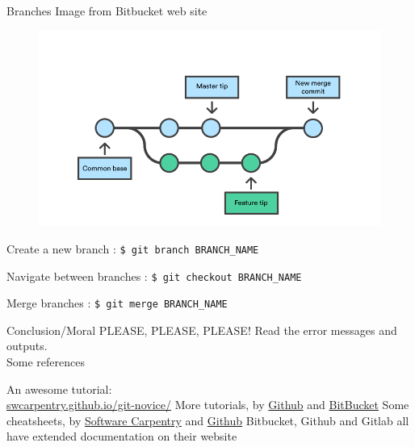 \documentclass{beamer}
\begin{document}
	\begin{frame}[fragile]{Branches}
		\footnotesize{Image from Bitbucket web site} \vspace{-.5cm}
		\begin{figure}[h]
			\centering
			\includegraphics[scale=.3]{branch.png}
		\end{figure}
		
		Create a new branch : \texttt{\$ git branch BRANCH\_NAME}
		
		Navigate between branches : \texttt{\$ git checkout BRANCH\_NAME}
		
		Merge branches : \texttt{\$ git merge BRANCH\_NAME}
	\end{frame}

	\begin{frame}{Conclusion/Moral}
	PLEASE, PLEASE, PLEASE! Read the error messages and outputs.\\
	\vspace{1em}
	\pause
	{\Large Some references}
	\begin{thebibliography}{99}
		 An awesome tutorial:\\ \url{swcarpentry.github.io/git-novice/}
		 More tutorials, by \href{https://guides.github.com/introduction/git-handbook/}{Github} and \href{https://www.atlassian.com/git/tutorials/learn-git-with-bitbucket-cloud}{BitBucket}
		 Some cheatsheets, by  \href{swcarpentry.github.io/git-novice/reference.html}{Software Carpentry} and \href{https://github.github.com/training-kit/downloads/github-git-cheat-sheet.pdf}{Github}
		 Bitbucket, Github and Gitlab all have extended documentation on their website
	\end{thebibliography}
	\end{frame}
\end{document}
